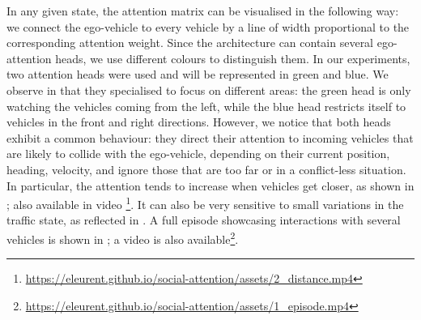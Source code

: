In any given state, the attention matrix can be visualised in the following way: we connect the ego-vehicle to every vehicle by a line of width proportional to the corresponding attention weight. Since the architecture can contain several ego-attention heads, we use different colours to distinguish them. In our experiments, two attention heads were used and will be represented in green and blue. We observe in  that they specialised to focus on different areas: the green head is only watching the vehicles coming from the left, while the blue head restricts itself to vehicles in the front and right directions. However, we notice that both heads exhibit a common behaviour: they direct their attention to incoming vehicles that are likely to collide with the ego-vehicle, depending on their current position, heading, velocity, and ignore those that are too far or in a conflict-less situation. In particular, the attention tends to increase when vehicles get closer, as shown in ; also available in video \footnote{\href{https://eleurent.github.io/social-attention/assets/2\_distance.mp4}{https://eleurent.github.io/social-attention/assets/2\_distance.mp4}}. It can also be very sensitive to small variations in the traffic state, as reflected in . A full episode showcasing interactions with several vehicles is shown in ; a video is also available\footnote{\href{https://eleurent.github.io/social-attention/assets/1\_episode.mp4}{https://eleurent.github.io/social-attention/assets/1\_episode.mp4}}.


